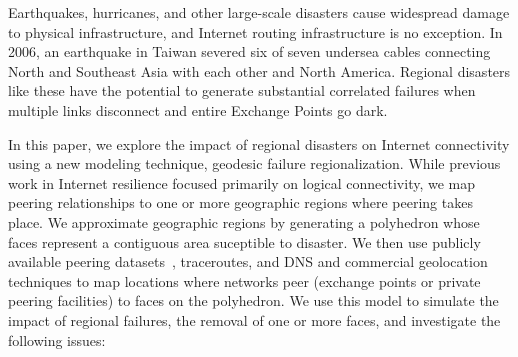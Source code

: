 

Earthquakes, hurricanes, and other large-scale disasters cause widespread damage
to physical infrastructure, and Internet routing infrastructure is no exception.
In 2006, an earthquake in Taiwan severed six of seven 
undersea cables connecting North and Southeast Asia with each other and North 
America. 
Regional disasters like these have the potential to generate substantial 
correlated failures when multiple links disconnect and entire Exchange Points
go dark.


In this paper, we explore the impact of regional disasters on Internet connectivity
using a new modeling technique, geodesic failure regionalization.
While previous work in Internet resilience focused primarily on logical connectivity, 
we map peering relationships to one or more geographic regions where peering takes place.
We approximate geographic regions by generating a polyhedron whose faces
represent a contiguous area suceptible to disaster. 
We then use publicly available peering datasets~\cite{brice, peeringdb}, traceroutes, and DNS and commercial
geolocation techniques to map locations where networks peer (exchange points or
 private peering facilities) to faces on the polyhedron.
We use this model to simulate the impact of regional failures, \ie{} the removal of
one or more faces, and investigate the following issues:



